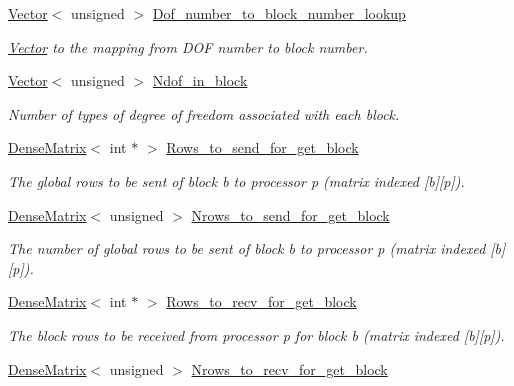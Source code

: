 \begin{DoxyCompactItemize}
\hyperlink{classoomph_1_1Vector}{Vector}$<$ unsigned $>$ \hyperlink{classoomph_1_1BlockPreconditioner_ae2f496bfa8307485101a3b8ac57e8c71}{Dof\+\_\+number\+\_\+to\+\_\+block\+\_\+number\+\_\+lookup}
\begin{DoxyCompactList}\small\item\em \hyperlink{classoomph_1_1Vector}{Vector} to the mapping from D\+OF number to block number. \end{DoxyCompactList}\item 
\hyperlink{classoomph_1_1Vector}{Vector}$<$ unsigned $>$ \hyperlink{classoomph_1_1BlockPreconditioner_a874cbe5520d546ee24004e229a48037e}{Ndof\+\_\+in\+\_\+block}
\begin{DoxyCompactList}\small\item\em Number of types of degree of freedom associated with each block. \end{DoxyCompactList}\item 
\hyperlink{classoomph_1_1DenseMatrix}{Dense\+Matrix}$<$ int $\ast$ $>$ \hyperlink{classoomph_1_1BlockPreconditioner_ac24e5ec4afe8904b3de7975ff0b2649d}{Rows\+\_\+to\+\_\+send\+\_\+for\+\_\+get\+\_\+block}
\begin{DoxyCompactList}\small\item\em The global rows to be sent of block b to processor p (matrix indexed \mbox{[}b\mbox{]}\mbox{[}p\mbox{]}). \end{DoxyCompactList}\item 
\hyperlink{classoomph_1_1DenseMatrix}{Dense\+Matrix}$<$ unsigned $>$ \hyperlink{classoomph_1_1BlockPreconditioner_a2080668f30dd3095ce8f2f791536f20e}{Nrows\+\_\+to\+\_\+send\+\_\+for\+\_\+get\+\_\+block}
\begin{DoxyCompactList}\small\item\em The number of global rows to be sent of block b to processor p (matrix indexed \mbox{[}b\mbox{]}\mbox{[}p\mbox{]}). \end{DoxyCompactList}\item 
\hyperlink{classoomph_1_1DenseMatrix}{Dense\+Matrix}$<$ int $\ast$ $>$ \hyperlink{classoomph_1_1BlockPreconditioner_a37d5573e5a7c9fba43f4364458e9075c}{Rows\+\_\+to\+\_\+recv\+\_\+for\+\_\+get\+\_\+block}
\begin{DoxyCompactList}\small\item\em The block rows to be received from processor p for block b (matrix indexed \mbox{[}b\mbox{]}\mbox{[}p\mbox{]}). \end{DoxyCompactList}\item 
\hyperlink{classoomph_1_1DenseMatrix}{Dense\+Matrix}$<$ unsigned $>$ \hyperlink{classoomph_1_1BlockPreconditioner_a9ab1a931e617f04a50e8f24e75069628}{Nrows\+\_\+to\+\_\+recv\+\_\+for\+\_\+get\+\_\+block}

\end{DoxyCompactItemize}
